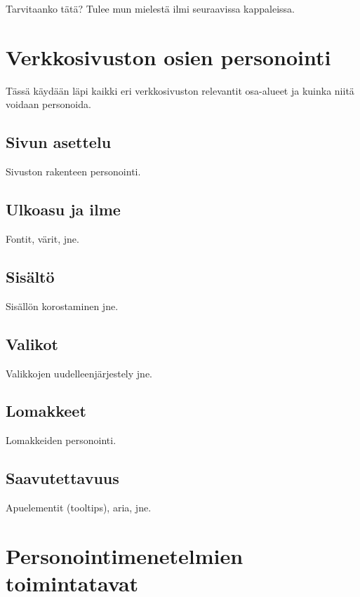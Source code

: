 \documentclass[finnish, 12pt, a4paper, elec, utf8, a-1b, online]{aaltothesis}
\begin{document}
Tarvitaanko tätä? Tulee mun mielestä ilmi seuraavissa kappaleissa.

\clearpage

\section{Verkkosivuston osien personointi}

Tässä käydään läpi kaikki eri verkkosivuston relevantit osa-alueet ja kuinka
niitä voidaan personoida.

\subsection{Sivun asettelu}

Sivuston rakenteen personointi.

\subsection{Ulkoasu ja ilme}

Fontit, värit, jne.

\subsection{Sisältö}

Sisällön korostaminen jne.

\subsection{Valikot}

Valikkojen uudelleenjärjestely jne.

\subsection{Lomakkeet}

Lomakkeiden personointi.

\subsection{Saavutettavuus}

Apuelementit (tooltips), aria, jne.

\clearpage

\section{Personointimenetelmien toimintatavat}
\end{document}
